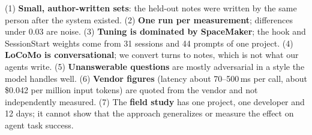 (1) \textbf{Small, author-written sets}: the held-out notes were written by the same person after the system existed. (2) \textbf{One run per measurement}; differences under 0.03 are noise. (3) \textbf{Tuning is dominated by SpaceMaker}; the hook and SessionStart weights come from 31 sessions and 44 prompts of one project. (4) \textbf{LoCoMo is conversational}; we convert turns to notes, which is not what our agents write. (5) \textbf{Unanswerable questions} are mostly adversarial in a style the model handles well. (6) \textbf{Vendor figures} (latency about 70--500\,ms per call, about \$0.042 per million input tokens) are quoted from the vendor and not independently measured. (7) The \textbf{field study} has one project, one developer and 12 days; it cannot show that the approach generalizes or measure the effect on agent task success.
